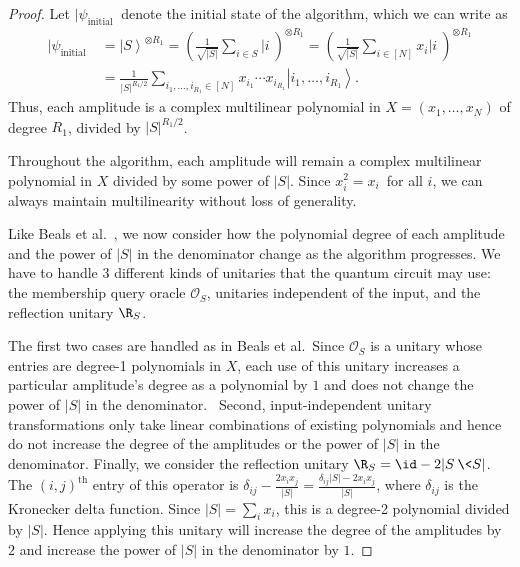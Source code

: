 \begin{proof}
Let $|\psi_\mathrm{initial}\>$ denote the initial state of the algorithm,
which we can write as
\begin{align*}
|\psi_\mathrm{initial}\> &=
\left\vert S\right\rangle ^{\otimes R_1}
=\left(\frac{1}{\sqrt{|S|}} \sum_{i\in S}|i\>\right)^{\otimes R_1}
=\left(\frac{1}{\sqrt{|S|}} \sum_{i\in [N]}x_i|i\>\right)^{\otimes R_1}\\
&=\frac{1}{\left\vert S\right\vert ^{R_1/2}}\sum_{i_{1},\ldots,i_{R_1}\in\left[
N\right]  }x_{i_{1}}\cdots x_{i_{R_1}}\left\vert i_{1},\ldots,i_{R_1}\right\rangle.
\end{align*}
Thus, each amplitude is a complex multilinear polynomial in $X=\left(
x_{1},\ldots,x_{N}\right)  $ of degree $R_1$, divided by $\left\vert
S\right\vert ^{R_1/2}$.

Throughout the algorithm, each amplitude will remain a complex multilinear
polynomial in $X$ divided by some power of $|S|$.
Since $x_{i}^{2}=x_{i}$\ for all $i$, we can always
maintain multilinearity without loss of generality.

Like Beals et al.\ \cite{bbcmw}, we now consider how the polynomial degree of each amplitude and the power of $|S|$ in the denominator change as the algorithm progresses.
We have to handle 3 different kinds of unitaries that the quantum circuit may use:
the membership query oracle $\mathcal{O}_S$, unitaries independent of the input,
and the reflection unitary $\R_S$.

The first two cases are handled as in Beals et al.\
Since $\mathcal{O}_S$ is a unitary whose entries are degree-1 polynomials
in $X$, each use of this unitary increases a particular
amplitude's degree as a polynomial by $1$ and does not change the power of $|S|$ in the denominator. \
Second, input-independent unitary transformations only take linear
combinations of existing polynomials and hence do not increase the degree of the amplitudes or the power of $|S|$ in the denominator.
Finally, we consider the reflection unitary $\R_S = \id - 2|S\>\<S|$.
The $(i,j)^\mathrm{th}$ entry of this operator is $\delta_{ij} - \frac{2x_ix_j}{|S|} = \frac{\delta_{ij}|S| - 2x_ix_j}{|S|}$, where $\delta_{ij}$ is the Kronecker delta function.
Since $|S| = \sum_i x_i$, this is a degree-2 polynomial divided by $|S|$.
Hence applying this unitary will increase the degree of the amplitudes by $2$ and increase
the power of $|S|$ in the denominator by $1$.


\end{proof}
